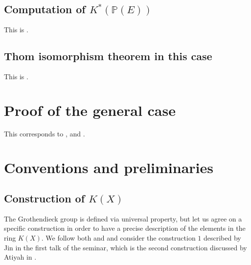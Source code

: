 \documentclass[12pt,a4paper]{amsart}
\theoremstyle{plain}
\theoremstyle{definition}
\theoremstyle{remark}
\begin{document}
\subsection{Computation of $K^{*}(\mathbb{P}(E))$}

This is \cite[Proposition 2.7.1]{ati67}.

\subsection{Thom isomorphism theorem in this case}

This is \cite[Proposition 2.7.2]{ati67}.

\section{Proof of the general case}

This corresponds to \cite[Proposition 2.7.8]{ati67}, \cite[Proposition 2.7.9]{ati67} and \cite[Proposition 2.7.12]{ati67}.

\appendix

\section{Conventions and preliminaries}

\subsection{Construction of $K(X)$}

The Grothendieck group is defined via universal property, but let us agree on a specific construction in order to have a precise description of the elements in the ring $K(X)$.
We follow both \cite{ati67} and \cite{hat03} and consider the construction $1$ described by Jin in the first talk of the seminar, which is the second construction discussed by Atiyah in \cite[p.~42]{ati67}.
\end{document}
